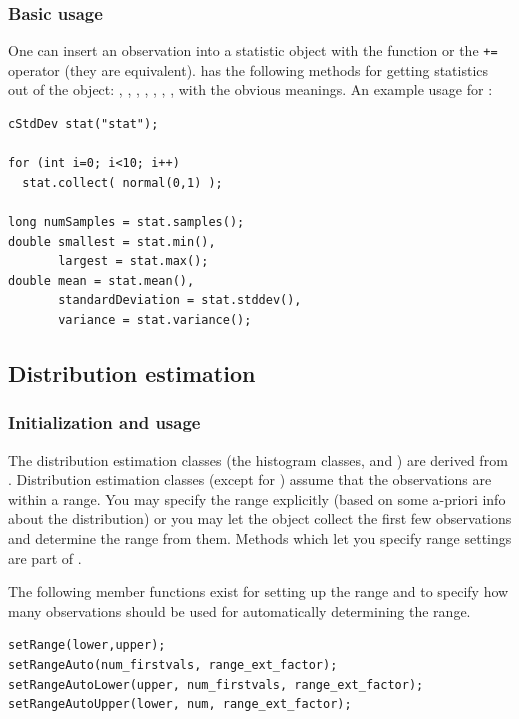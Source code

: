 \subsubsection{Basic usage}

One can insert an observation into a statistic object with the
 function or the \texttt{+=} operator (they are
equivalent).   has the following methods for getting
statistics out of the object: , ,
, , , ,
,  with the obvious meanings. An example
usage for :

\begin{verbatim}
cStdDev stat("stat");

for (int i=0; i<10; i++)
  stat.collect( normal(0,1) );

long numSamples = stat.samples();
double smallest = stat.min(),
       largest = stat.max();
double mean = stat.mean(),
       standardDeviation = stat.stddev(),
       variance = stat.variance();
\end{verbatim}





\subsection{Distribution estimation}

\subsubsection{Initialization and usage}


The distribution estimation classes (the histogram classes,
 and ) are derived from
. Distribution estimation classes (except for
) assume that the observations are within a range.
You may specify the range explicitly (based on some a-priori info
about the distribution) or you may let the object collect the first
few observations and determine the range from them. Methods which let
you specify range settings are part of .

The following member functions exist for setting up the range
and to specify how many observations should be used for
automatically determining the range.

\begin{verbatim}
setRange(lower,upper);
setRangeAuto(num_firstvals, range_ext_factor);
setRangeAutoLower(upper, num_firstvals, range_ext_factor);
setRangeAutoUpper(lower, num, range_ext_factor);
\end{verbatim}

